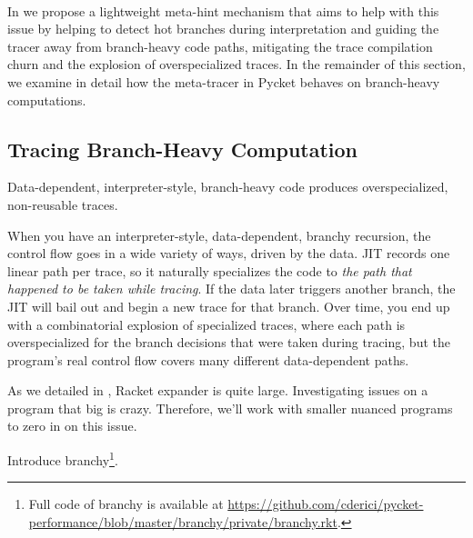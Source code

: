 		\paragraph{}%
			In  we propose a lightweight meta-hint mechanism that aims to help with this issue by helping to detect hot branches during interpretation and guiding the tracer away from branch-heavy code paths, mitigating the trace compilation churn and the explosion of overspecialized traces. In the remainder of this section, we examine in detail how the meta-tracer in Pycket behaves on branch-heavy computations.

		\subsection{Tracing Branch-Heavy Computation}
			\begin{mainpoint}
				Data-dependent, interpreter-style, branch-heavy code produces overspecialized, non-reusable traces.
			\end{mainpoint}
				\label{section:branchy}

			\begin{paragraph-here}
				When you have an interpreter-style, data-dependent, branchy recursion, the control flow goes in a wide variety of ways, driven by the data. JIT records one linear path per trace, so it naturally specializes the code to \emph{the path that happened to be taken while tracing}. If the data later triggers another branch, the JIT will bail out and begin a new trace for that branch. Over time, you end up with a combinatorial explosion of specialized traces, where each path is overspecialized for the branch decisions that were taken during tracing, but the program's real control flow covers many different data-dependent paths.
			\end{paragraph-here}

			\begin{paragraph-here}
				As we detailed in , Racket expander is quite large.
				Investigating issues on a program that big is crazy. Therefore, we'll work with smaller nuanced programs to zero in on this issue.
			\end{paragraph-here}


			Introduce branchy\footnote{Full code of branchy is available at \url{https://github.com/cderici/pycket-performance/blob/master/branchy/private/branchy.rkt}.}.

